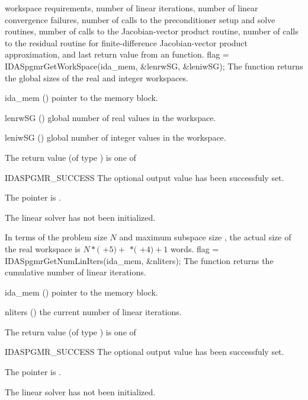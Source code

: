 workspace requirements, number of linear iterations,
number of linear convergence failures, number of calls to the preconditioner
setup and solve routines, number of calls to the Jacobian-vector product routine,
 number of calls to the residual routine for finite-difference  Jacobian-vector
 product approximation, and last return value from an {\idaspgmr} function.
{
  flag = IDASpgmrGetWorkSpace(ida\_mem, \&lenrwSG, \&leniwSG);
}
{
  The function  returns the global sizes of
  the {\idaspgmr} real and integer workspaces.
}
{
  \begin{args}[lenrwSG]
  \item[ida\_mem] ()
    pointer to the {\ida} memory block.
  \item[lenrwSG] ()
    global number of real values in the {\idaspgmr} workspace.
  \item[leniwSG] ()
    global number of integer values in the {\idaspgmr} workspace.
  \end{args}
}
{
  The return value  (of type ) is one of
  \begin{args}
  \item[IDASPGMR\_SUCCESS] 
    The optional output value has been successfuly set.
  \item[\Id{IDASPGMR\_MEM\_NULL}]
    The  pointer is .
  \item[\Id{IDASPGMR\_LMEM\_NULL}]
    The {\idaspgmr} linear solver has not been initialized.
  \end{args}
}
{
  In terms of the problem size $N$ and maximum subspace size , 
  the actual size of the real workspace is
  $N*($  $+ 5) +$  $*($  $ + 4) + 1$  words.
}
{
  flag = IDASpgmrGetNumLinIters(ida\_mem, \&nliters);
}
{
  The function  returns the
  cumulative number of linear iterations.
}
{
  \begin{args}[nliters]
  \item[ida\_mem] ()
    pointer to the {\ida} memory block.
  \item[nliters] ()
    the current number of linear iterations.
  \end{args}
}
{
  The return value  (of type ) is one of
  \begin{args}
  \item[IDASPGMR\_SUCCESS] 
    The optional output value has been successfuly set.
  \item[\Id{IDASPGMR\_MEM\_NULL}]
    The  pointer is .
  \item[\Id{IDASPGMR\_LMEM\_NULL}]
    The {\idaspgmr} linear solver has not been initialized.
  \end{args}
}
